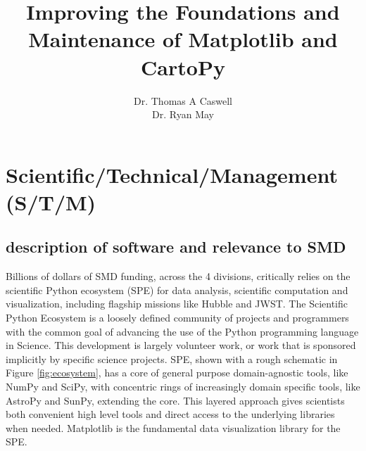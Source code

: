 \documentclass[12pt]{article}
\numberwithin{page}{section}
\begin{document}
\title{Improving the Foundations and Maintenance of Matplotlib and CartoPy}
\author{Dr. Thomas A Caswell\\Dr. Ryan May}
\date{}
\maketitle

\setcounter{tocdepth}{2}
\tableofcontents
\thispagestyle{empty}
\newpage

\section{Scientific/Technical/Management (S/T/M)}
\setcounter{page}{1}

\subsection{description of software and relevance to SMD}

Billions of dollars of SMD funding, across the 4 divisions, critically
relies on the scientific Python ecosystem (SPE) for data analysis,
scientific computation and visualization, including flagship missions
like Hubble and JWST.  The Scientific Python Ecosystem is a loosely
defined community of projects and programmers with the common goal of
advancing the use of the Python programming language in Science.  This
development is largely volunteer work, or work that is sponsored
implicitly by specific science projects.  SPE, shown with a rough
schematic in Figure \ref{fig:ecosystem}, has a core of general purpose
domain-agnostic tools, like NumPy\cite{Harris2020} and
SciPy\cite{Virtanen2020}, with concentric rings of increasingly domain
specific tools, like AstroPy\cite{robitaille2013astropy} and
SunPy\cite{sunpy_community2020}, extending the core.  This layered
approach gives scientists both convenient high level tools and direct
access to the underlying libraries when needed.
Matplotlib\cite{Hunter:2007} is the fundamental data visualization
library for the SPE.
\end{document}

